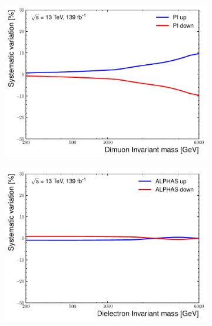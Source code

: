 \begin{figure}[h!]
\begin{subfigure}[h]{0.42\textwidth}
        \centering
        \includegraphics[width=\textwidth]{figures/analysis/datamc/Uncertainties/theory/mm/backgroundTemplate_KF_PI__1up.pdf}
        \label{fig:uncert:mmPI}
    \end{subfigure}
    \begin{subfigure}[h]{0.42\textwidth}
        \includegraphics[width=\textwidth]{figures/analysis/datamc/Uncertainties/theory/ee/backgroundTemplate_KF_ALPHAS__1up.pdf}
        \label{fig:uncert:eealpha}
    \end{subfigure}
    \begin{subfigure}[h]{0.42\textwidth}
        \centering

\end{subfigure}
\end{figure}

